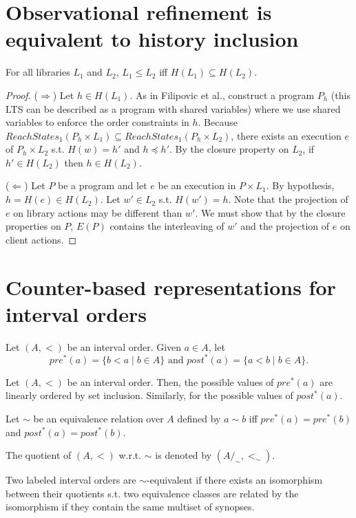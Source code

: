 \section{Observational refinement is equivalent to history inclusion}

\begin{theorem}
For all libraries $L_1$ and $L_2$, 
$L_1 \leq L_2$ iff $H(L_1) \subseteq H(L_2)$.
\end{theorem}
\begin{proof}
($\Rightarrow$) Let $h\in H(L_1)$. As in Filipovic et al., construct a program $P_h$ (this LTS can be described as a program with shared variables) where we use shared variables to enforce the order constraints in $h$. Because $ReachStates_1(P_h\times L_1) \subseteq ReachStates_1(P_h\times L_2)$, there exists an execution $e$ of $P_h\times L_2$ s.t. $H(w)=h'$ and $h\preceq h'$. By the closure property on $L_2$, if $h'\in H(L_2)$ then $h\in H(L_2)$. 

($\Leftarrow$) Let $P$ be a program and let $e$ be an execution in $P\times L_1$. By hypothesis, $h=H(e)\in H(L_2)$. Let $w'\in L_2$ s.t. $H(w')=h$. Note that the projection of $e$ on library actions may be different than $w'$. We must show that by the closure properties on $P$, $E(P)$ contains the interleaving of $w'$ and the projection of $e$ on client actions.
\end{proof}

\section{Counter-based representations for interval orders}

Let $(A,<)$ be an interval order.
Given $a\in A$, let 
\[
pre^*(a)=\{b < a\mid b\in A\}\mbox{ and }post^*(a)=\{a < b\mid b\in A\}.
\]

\begin{lemma}
Let $(A,<)$ be an interval order. Then, the possible values of $pre^*(a)$ are linearly ordered by set inclusion. Similarly, for the possible values of $post^*(a)$.
\end{lemma}

Let $\sim$ be an equivalence relation over $A$ defined by $a\sim b$ iff $pre^*(a)=pre^*(b)$ and $post^*(a)=post^*(b)$.

The quotient of $(A,<)$ w.r.t. $\sim$ is denoted by $(A/_\sim,<_\sim)$.

Two labeled interval orders are $\sim$-equivalent if there exists an isomorphism between their quotients s.t. two equivalence classes are related by the isomorphism if they contain the same multiset of synopses. 

